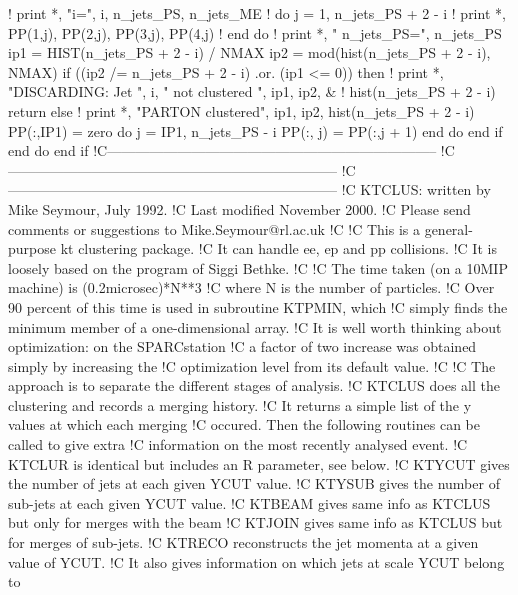       ! print *, "i=",  i, n_jets_PS, n_jets_ME
      ! do j = 1, n_jets_PS + 2 - i
      !    print *, PP(1,j), PP(2,j), PP(3,j), PP(4,j)
      ! end do
      ! print *, " n_jets_PS=", n_jets_PS
      ip1 = HIST(n_jets_PS + 2 - i) / NMAX
      ip2 = mod(hist(n_jets_PS + 2 - i), NMAX)
      if ((ip2 /= n_jets_PS + 2 - i) .or. (ip1 <= 0)) then
         ! print *, "DISCARDING: Jet ", i, " not clustered ", ip1, ip2, &
         !      hist(n_jets_PS + 2 - i)
         return
      else
         ! print *, "PARTON clustered", ip1, ip2, hist(n_jets_PS + 2 - i)
         PP(:,IP1) = zero
         do j = IP1, n_jets_PS - i
            PP(:, j) = PP(:,j + 1)
         end do
      end if
   end do
end if
\nwendcode{}\nwdocspar
\nwenddocs{}\plusendmoddef
!C-----------------------------------------------------------------------
!C-----------------------------------------------------------------------
!C-----------------------------------------------------------------------
!C     KTCLUS: written by Mike Seymour, July 1992.
!C     Last modified November 2000.
!C     Please send comments or suggestions to Mike.Seymour@rl.ac.uk
!C
!C     This is a general-purpose kt clustering package.
!C     It can handle ee, ep and pp collisions.
!C     It is loosely based on the program of Siggi Bethke.
!C
!C     The time taken (on a 10MIP machine) is (0.2microsec)*N**3
!C     where N is the number of particles.
!C     Over 90 percent of this time is used in subroutine KTPMIN, which
!C     simply finds the minimum member of a one-dimensional array.
!C     It is well worth thinking about optimization: on the SPARCstation
!C     a factor of two increase was obtained simply by increasing the
!C     optimization level from its default value.
!C
!C     The approach is to separate the different stages of analysis.
!C     KTCLUS does all the clustering and records a merging history.
!C     It returns a simple list of the y values at which each merging
!C     occured. Then the following routines can be called to give extra
!C     information on the most recently analysed event.
!C     KTCLUR is identical but includes an R parameter, see below.
!C     KTYCUT gives the number of jets at each given YCUT value.
!C     KTYSUB gives the number of sub-jets at each given YCUT value.
!C     KTBEAM gives same info as KTCLUS but only for merges with the beam
!C     KTJOIN gives same info as KTCLUS but for merges of sub-jets.
!C     KTRECO reconstructs the jet momenta at a given value of YCUT.
!C     It also gives information on which jets at scale YCUT belong to
